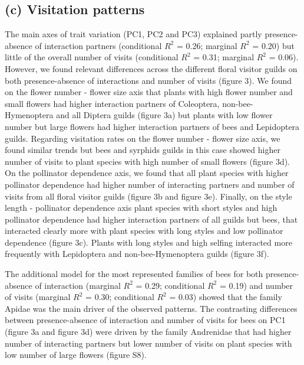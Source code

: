 \documentclass[
  12pt,
  a4paper,
]{article}
\begin{document}
\hypertarget{c-visitation-patterns}{%
\subsection{(c) Visitation patterns}\label{c-visitation-patterns}}

The main axes of trait variation (PC1, PC2 and PC3) explained partly presence-absence of interaction partners (conditional \(R^{2}\) = 0.26; marginal \(R^{2}\) = 0.20) but little of the overall number of visits (conditional \(R^{2}\) = 0.31; marginal \(R^{2}\) = 0.06). However, we found relevant differences across the different floral visitor guilds on both presence-absence of interactions and number of visits (figure 3). We found on the flower number - flower size axis that plants with high flower number and small flowers had higher interaction partners of Coleoptera, non-bee-Hymenoptera and all Diptera guilds (figure 3a) but plants with low flower number but large flowers had higher interaction partners of bees and Lepidoptera guilds. Regarding visitation rates on the flower number - flower size axis, we found similar trends but bees and syrphids guilds in this case showed higher number of visits to plant species with high number of small flowers (figure 3d). On the pollinator dependence axis, we found that all plant species with higher pollinator dependence had higher number of interacting partners and number of visits from all floral visitor guilds (figure 3b and figure 3e). Finally, on the style length - pollinator dependence axis plant species with short styles and high pollinator dependence had higher interaction partners of all guilds but bees, that interacted clearly more with plant species with long styles and low pollinator dependence (figure 3c). Plants with long styles and high selfing interacted more frequently with Lepidoptera and non-bee-Hymenoptera guilds (figure 3f).

The additional model for the most represented families of bees for both presence-absence of interaction (marginal \(R^{2}\) = 0.29; conditional \(R^{2}\) = 0.19) and number of visits (marginal \(R^{2}\) = 0.30; conditional \(R^{2}\) = 0.03) showed that the family Apidae was the main driver of the observed patterns. The contrasting differences between presence-absence of interaction and number of visits for bees on PC1 (figure 3a and figure 3d) were driven by the family Andrenidae that had higher number of interacting partners but lower number of visits on plant species with low number of large flowers (figure S8).
\end{document}
